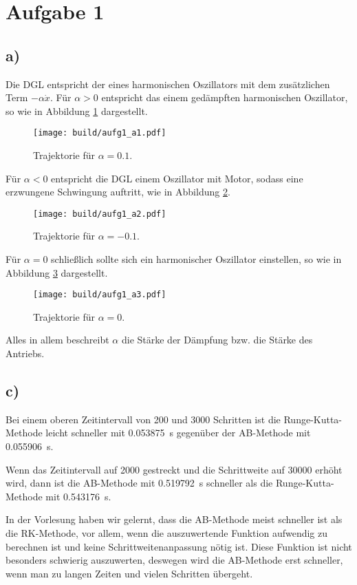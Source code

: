 \section*{Aufgabe 1}
\subsection*{a)}
Die DGL entspricht der eines harmonischen Oszillators mit dem zusätzlichen
Term $- \alpha \dot{x}$. Für $\alpha > 0$ entspricht das einem gedämpften
harmonischen Oszillator, so wie in Abbildung \ref{fig:gedämpft} dargestellt.

\begin{figure}
  \centering
  \texttt{[image: build/aufg1\_a1.pdf]}
  \caption{Trajektorie für $\alpha = 0.1$.}
  \label{fig:gedämpft}
\end{figure}

Für $\alpha < 0$ entspricht die DGL einem Oszillator mit Motor, sodass eine
erzwungene Schwingung auftritt, wie in Abbildung \ref{fig:erzwungen}.

\begin{figure}
  \centering
  \texttt{[image: build/aufg1\_a2.pdf]}
  \caption{Trajektorie für $\alpha = -0.1$.}
  \label{fig:erzwungen}
\end{figure}

Für $\alpha = 0$ schließlich sollte sich ein harmonischer Oszillator einstellen,
so wie in Abbildung \ref{fig:harmonisch} dargestellt.

\begin{figure}
  \centering
  \texttt{[image: build/aufg1\_a3.pdf]}
  \caption{Trajektorie für $\alpha = 0$.}
  \label{fig:harmonisch}
\end{figure}

Alles in allem beschreibt $\alpha$ die Stärke der Dämpfung bzw. die Stärke des
Antriebs.

\subsection*{c)}
Bei einem oberen Zeitintervall von 200 und 3000 Schritten ist die Runge-Kutta-Methode
leicht schneller mit \SI{0.053875}{\s} gegenüber der AB-Methode mit \SI{0.055906}{\s}.

Wenn das Zeitintervall auf 2000 gestreckt und die Schrittweite auf 30000 erhöht wird,
dann ist die AB-Methode mit \SI{0.519792}{\s} schneller als die Runge-Kutta-Methode
mit \SI{0.543176}{\s}.

In der Vorlesung haben wir gelernt, dass die AB-Methode meist schneller ist als
die RK-Methode, vor allem, wenn die auszuwertende Funktion aufwendig zu berechnen
ist und keine Schrittweitenanpassung nötig ist. Diese Funktion ist nicht besonders
schwierig auszuwerten, deswegen wird die AB-Methode erst schneller, wenn man zu
langen Zeiten und vielen Schritten übergeht.
